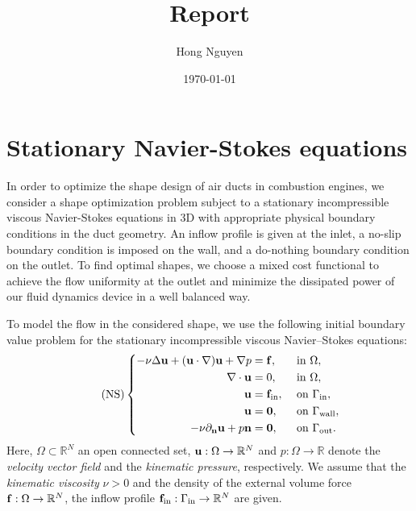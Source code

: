 \documentclass[11pt]{article}
\title{Report}
\author{Hong Nguyen}
\date{\today}
\numberwithin{equation}{section}
\begin{document}
\maketitle
\setcounter{secnumdepth}{6}
\tableofcontents


\section{Stationary Navier-Stokes equations}
In order to optimize the shape design of air ducts in combustion engines, we consider a shape optimization problem subject to a stationary incompressible viscous Navier-Stokes equations in 3D with appropriate physical boundary conditions in the duct geometry. An inflow profile is given at the inlet, a no-slip boundary condition is imposed on the wall, and a do-nothing boundary condition on the outlet. To find optimal shapes, we choose a mixed cost functional to achieve the flow uniformity at the outlet and minimize the dissipated power of our fluid dynamics device in a well balanced way.

To model the flow in the considered shape, we use the following initial boundary value problem for the stationary incompressible viscous Navier--Stokes equations:
\begin{equation}
    \label{NS}
    \tag{NS}
    \left\{\begin{split}
        -\nu\Delta{\bf u} + ({\bf u}\cdot\nabla){\bf u} + \nabla p &= {\bf f},&&\mbox{ in }\Omega,\\
        \nabla\cdot{\bf u} &= 0,&&\mbox{ in }\Omega,\\
        {\bf u} &= {\bf f}_{\rm in},&&\mbox{ on }\Gamma_{\rm in},\\
        {\bf u} &= {\bf 0},&&\mbox{ on }\Gamma_{\rm wall},\\
        -\nu\partial_{\bf n}{\bf u} + p{\bf n} &= {\bf 0},&&\mbox{ on }\Gamma_{\rm out}.
    \end{split}\right.
\end{equation}
Here, $\Omega\subset\mathbb{R}^N$ an open connected set, ${\bf u}:\Omega\to\mathbb{R}^N$ and $p:\Omega\to\mathbb{R}$ denote the \textit{velocity vector field} and the \textit{kinematic pressure}, respectively. We assume that the \textit{kinematic viscosity} $\nu > 0$ and the density of the external volume force ${\bf f}:\Omega\to\mathbb{R}^N$, the inflow profile ${\bf f}_{\rm in}:\Gamma_{\rm in}\to\mathbb{R}^N$ are given.
\end{document}
